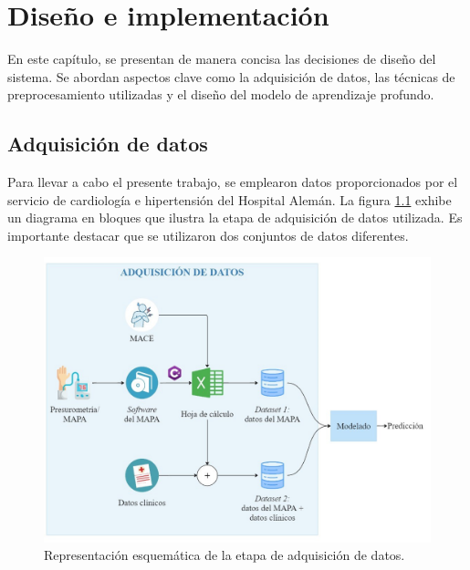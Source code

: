 \chapter{Diseño e implementación} %

\label{Chapter3} %

En este capítulo, se presentan de manera concisa las decisiones de diseño del sistema. 
Se abordan aspectos clave como la adquisición de datos, las técnicas de preprocesamiento 
utilizadas y el diseño del modelo de aprendizaje profundo. 

\section{Adquisición de datos}
 
\newcommand{\myhash}{\raisebox{\depth}{\#}}

Para llevar a cabo el presente trabajo, se emplearon datos proporcionados por el servicio 
de cardiología e hipertensión del Hospital Alemán. La figura \ref{fig:adquisicion_datos} 
exhibe un diagrama en bloques que ilustra la etapa de adquisición de datos utilizada. 
Es importante destacar que se utilizaron dos conjuntos de datos diferentes. 

\begin{figure}[ht]
	\centering
	\includegraphics[width=\textwidth]{./Figures/adquisicion_datos2.jpg}
	\caption{Representación esquemática de la etapa de adquisición de datos.}\label{fig:adquisicion_datos}
\end{figure}

